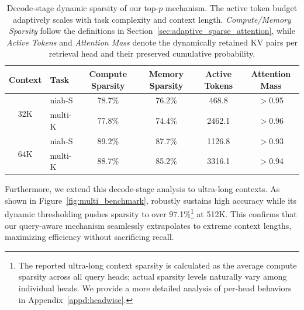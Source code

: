 \begin{table}[t]
\centering
\small
\caption{Decode-stage dynamic sparsity of our top-$p$ mechanism. The active token budget adaptively scales with task complexity and context length. \textit{Compute/Memory Sparsity} follow the definitions in Section~\ref{sec:adaptive_sparse_attention}, while \textit{Active Tokens} and \textit{Attention Mass} denote the dynamically retained KV pairs per retrieval head and their preserved cumulative probability.}
\label{tab:dynamic_sparsity}
\begin{tabular}{clcccc}
\toprule
\textbf{Context} & \textbf{Task} & \textbf{Compute Sparsity} & \textbf{Memory Sparsity} & \textbf{Active Tokens} & \textbf{Attention Mass} \\
\midrule
\multirow{2}{*}{32K} & niah-S & 78.7\% & 76.2\% & 468.8 & $>$0.95 \\
                     & multi-K & 77.8\% & 74.4\% & 2462.1 & $>$0.96 \\
\midrule
\multirow{2}{*}{64K} & niah-S & 89.2\% & 87.7\% & 1126.8 & $>$0.93 \\
                     & multi-K  & 88.7\% & 85.2\% & 3316.1 & $>$0.94 \\
\bottomrule
\end{tabular}
\end{table}

Furthermore, we extend this decode-stage analysis to ultra-long contexts. As shown in Figure~\ref{fig:multi_benchmark}, \name robustly sustains high accuracy while its dynamic thresholding pushes sparsity to over 97.1\%\footnote{The reported ultra-long context sparsity is calculated as the average compute sparsity across all query heads; actual sparsity levels naturally vary among individual heads. We provide a more detailed analysis of per-head behaviors in Appendix~\ref{appd:headwise}.} at 512K. This confirms that our query-aware mechanism seamlessly extrapolates to extreme context lengths, maximizing efficiency without sacrificing recall. 


